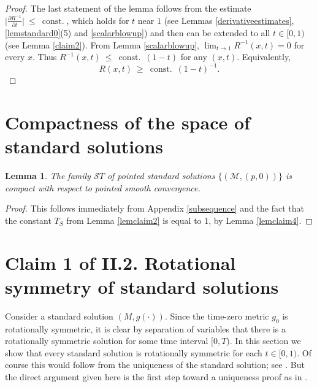 \documentclass[12pt]{amsart}
\newcommand{\const}{\operatorname{const.}}
\newcommand{\M}{{\mathcal M}}
\numberwithin{equation}{section}
\theoremstyle{plain}
\newtheorem{lemma}[equation]{Lemma}
\theoremstyle{definition}
\theoremstyle{remark}
\begin{document}
\begin{proof}
The last statement of the lemma follows from the estimate 
$\Big| \frac{\partial R^{-1}}{\partial t} \Big| \: \le \: \const$, which holds
for $t$ near $1$ 
(see Lemmas \ref{derivativeestimates}, 
\ref{lemstandard0}(5) and \ref{scalarblowup})
and then can be extended to all $t \in [0,1)$ (see Lemma \ref{claim2}).
From Lemma \ref{scalarblowup}, $\lim_{t \rightarrow 1} R^{-1}(x,t)=0$ for 
every $x$.  Thus $R^{-1}(x, t )\: \leq \: \const \: (1-t)$ for any $(x,t)$.
Equivalently,
\begin{equation}
R(x,t) \: \geq \: \const \: (1-t)^{-1}.
\end{equation}
\end{proof}

\section{Compactness of the space of standard solutions} 
\label{standardlycompact}

\begin{lemma} \label{standardcompactness}
The family ${\mathcal ST}$ of pointed standard solutions $\{(\M,(p,0))\}$ 
is compact with respect to
pointed smooth convergence. 
\end{lemma}
\begin{proof}
This follows immediately from  Appendix \ref{subsequence}
and the fact that the constant $T_S$ from Lemma \ref{lemclaim2}
is equal to $1$, by Lemma \ref{lemclaim4}.
\end{proof}


\section{Claim 1 of II.2. Rotational symmetry of standard solutions} \label{claimII.2.1}

Consider a standard solution $(M,g(\cdot))$.
Since the time-zero metric $g_0$ is rotationally symmetric, it is clear
by separation of variables that there is a rotationally symmetric
solution for some time interval $[0, T)$.  In this section we
show that every standard solution is rotationally
symmetric for each $t \in [0,1)$.
Of course this would follow from the uniqueness of the 
standard solution; see \cite{Chen-Zhu,Lu-Tian}. But the direct argument given
here is the first step toward a uniqueness proof as in \cite{Lu-Tian}.
\end{document}
